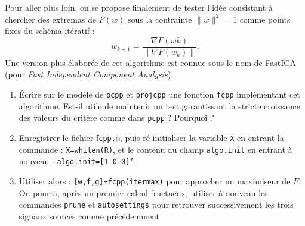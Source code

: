 \documentclass[10pt,a4paper,fleqn]{report}
\newcommand{\onit}{\begin{enumerate}}
\newcommand{\offit}{\end{enumerate}}
\newcommand{\grad}{\nabla}
\renewcommand{\tt}{\texttt}
\begin{document}
Pour aller plus loin, on se propose finalement de tester l'id\'{e}e consistant \`{a} chercher des
extremas de $F(w)$ sous la contrainte $\|w\|^2=1$ comme points fixes du sch\'ema it\'{e}ratif :
\[
w_{k+1}=\frac{\grad F(wk)}{\| \grad F(w_k)\|}.
\]
Une version plus \'{e}labor\'{e}e de cet algorithme est connue sous le nom de FastICA (pour \textit{Fast Independent Component Analysis}).
\onit
\item \'Ecrire sur le mod\`ele de \tt{pcpp} et \tt{projcpp} une fonction \tt{fcpp} impl\'{e}mentant cet algorithme. Est-il utile de maintenir un test garantissant la stricte croissance des valeurs du crit\`{e}re comme dans \tt{pcpp} ? Pourquoi ?
\item Enregistrer le fichier f\tt{cpp.m}, puis r\'e-initialiser la variable \tt X en entrant la commande : \tt{X=whiten(R)}, et le contenu du champ \tt{algo.init} en entrant \`{a} nouveau : \mbox{\tt{algo.init=[1 0 0]'}}.
\item Utiliser alors : \tt{[w,f,g]=fcpp(itermax)} pour approcher un maximiseur de $F$. On pourra, apr\`{e}s un premier calcul fructueux, utiliser \`{a} nouveau les commandes \tt{prune} et \tt{autosettings} pour retrouver successivement les trois signaux sources comme pr\'{e}c\'{e}demment
\offit
\end{document}
